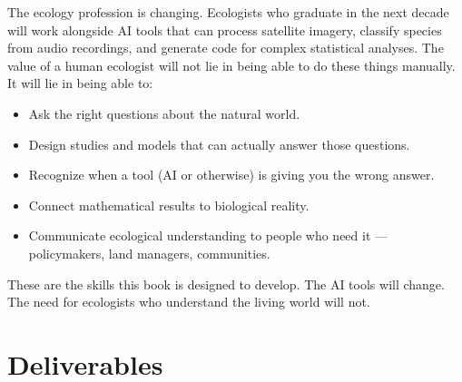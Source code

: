 \documentclass[
  letterpaper,
  DIV=11,
  numbers=noendperiod]{scrreprt}
\providecommand{\tightlist}{%
  \setlength{\itemsep}{0pt}\setlength{\parskip}{0pt}}
\begin{document}
The ecology profession is changing. Ecologists who graduate in the next
decade will work alongside AI tools that can process satellite imagery,
classify species from audio recordings, and generate code for complex
statistical analyses. The value of a human ecologist will not lie in
being able to do these things manually. It will lie in being able to:

\begin{itemize}
\tightlist
\item
  Ask the right questions about the natural world.
\item
  Design studies and models that can actually answer those questions.
\item
  Recognize when a tool (AI or otherwise) is giving you the wrong
  answer.
\item
  Connect mathematical results to biological reality.
\item
  Communicate ecological understanding to people who need it ---
  policymakers, land managers, communities.
\end{itemize}

These are the skills this book is designed to develop. The AI tools will
change. The need for ecologists who understand the living world will
not.

\section{Deliverables}\label{deliverables}
\end{document}
